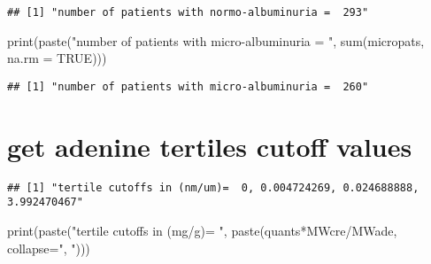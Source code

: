 \documentclass[
]{article}
\newenvironment{Shaded}{\begin{snugshade}}{\end{snugshade}}
\newcommand{\AttributeTok}[1]{\textcolor[rgb]{0.77,0.63,0.00}{#1}}
\newcommand{\ConstantTok}[1]{\textcolor[rgb]{0.00,0.00,0.00}{#1}}
\newcommand{\DecValTok}[1]{\textcolor[rgb]{0.00,0.00,0.81}{#1}}
\newcommand{\FunctionTok}[1]{\textcolor[rgb]{0.00,0.00,0.00}{#1}}
\newcommand{\NormalTok}[1]{#1}
\newcommand{\OtherTok}[1]{\textcolor[rgb]{0.56,0.35,0.01}{#1}}
\newcommand{\SpecialCharTok}[1]{\textcolor[rgb]{0.00,0.00,0.00}{#1}}
\newcommand{\StringTok}[1]{\textcolor[rgb]{0.31,0.60,0.02}{#1}}
\begin{document}
\begin{verbatim}
## [1] "number of patients with normo-albuminuria =  293"
\end{verbatim}

\begin{Shaded}
\begin{Highlighting}[]
\FunctionTok{print}\NormalTok{(}\FunctionTok{paste}\NormalTok{(}\StringTok{"number of patients with micro{-}albuminuria = "}\NormalTok{, }\FunctionTok{sum}\NormalTok{(micropats, }\AttributeTok{na.rm =} \ConstantTok{TRUE}\NormalTok{)))}
\end{Highlighting}
\end{Shaded}

\begin{verbatim}
## [1] "number of patients with micro-albuminuria =  260"
\end{verbatim}

\hypertarget{get-adenine-tertiles-cutoff-values}{%
\section{get adenine tertiles cutoff
values}\label{get-adenine-tertiles-cutoff-values}}

\begin{Shaded}
\end{Shaded}

\begin{verbatim}
## [1] "tertile cutoffs in (nm/um)=  0, 0.004724269, 0.024688888, 3.992470467"
\end{verbatim}

\begin{Shaded}
\begin{Highlighting}[]
\FunctionTok{print}\NormalTok{(}\FunctionTok{paste}\NormalTok{(}\StringTok{"tertile cutoffs in (mg/g)= "}\NormalTok{, }\FunctionTok{paste}\NormalTok{(quants}\SpecialCharTok{*}\NormalTok{MWcre}\SpecialCharTok{/}\NormalTok{MWade, }\AttributeTok{collapse=}\StringTok{", "}\NormalTok{)))}
\end{Highlighting}
\end{Shaded}
\end{document}
